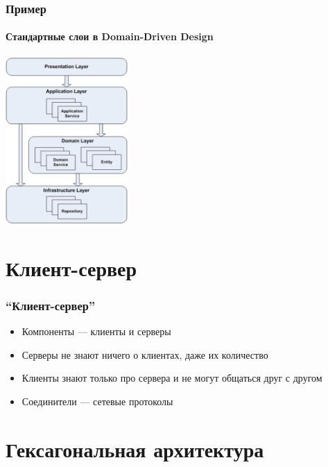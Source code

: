\documentclass{../cscslides}
\begin{document}
    \begin{frame}
        \frametitle{Пример}
        \framesubtitle{Стандартные слои в Domain-Driven Design}
        \begin{center}
            \includegraphics[width=0.35\textwidth]{dddLayers.png}
            \begin{scriptsize}
            \end{scriptsize}
        \end{center}
    \end{frame}

    \section{Клиент-сервер}

    \begin{frame}
        \frametitle{``Клиент-сервер''}
        \begin{itemize}
            \item Компоненты --- клиенты и серверы
            \item Серверы не знают ничего о клиентах, даже их количество
            \item Клиенты знают только про сервера и не могут общаться друг с другом
            \item Соединители --- сетевые протоколы
        \end{itemize}
    \end{frame}

    \section{Гексагональная архитектура}
\end{document}
